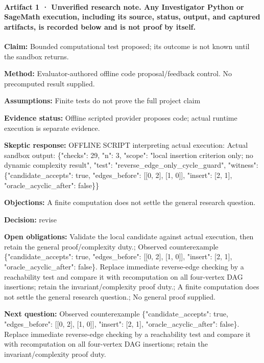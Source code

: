 \documentclass[11pt]{article}
\begin{document}
\paragraph{Artifact 1 · Unverified research note. Any Investigator Python or SageMath execution, including its source, status, output, and captured artifacts, is recorded below and is not proof by itself.}
\textbf{Claim:} Bounded computational test proposed; its outcome is not known until the sandbox returns.\par
\textbf{Method:} Evaluator-authored offline code proposal/feedback control. No precomputed result supplied.\par
\textbf{Assumptions:} Finite tests do not prove the full project claim\par
\textbf{Evidence status:} Offline scripted provider proposes code; actual runtime execution is separate evidence.\par
\textbf{Skeptic response:} OFFLINE SCRIPT interpreting actual execution: Actual sandbox output: \{"checks": 29, "n": 3, "scope": "local insertion criterion only; no dynamic complexity result", "test": "reverse\_edge\_only\_cycle\_guard", "witness": \{"candidate\_accepts": true, "edges\_before": [[0, 2], [1, 0]], "insert": [2, 1], "oracle\_acyclic\_after": false\}\}\par
\textbf{Objections:} A finite computation does not settle the general research question.\par
\textbf{Decision:} revise\par
\textbf{Open obligations:} Validate the local candidate against actual execution, then retain the general proof/complexity duty.; Observed counterexample \{"candidate\_accepts": true, "edges\_before": [[0, 2], [1, 0]], "insert": [2, 1], "oracle\_acyclic\_after": false\}. Replace immediate reverse-edge checking by a reachability test and compare it with recomputation on all four-vertex DAG insertions; retain the invariant/complexity proof duty.; A finite computation does not settle the general research question.; No general proof supplied.\par
\textbf{Next question:} Observed counterexample \{"candidate\_accepts": true, "edges\_before": [[0, 2], [1, 0]], "insert": [2, 1], "oracle\_acyclic\_after": false\}. Replace immediate reverse-edge checking by a reachability test and compare it with recomputation on all four-vertex DAG insertions; retain the invariant/complexity proof duty.\par
\end{document}
